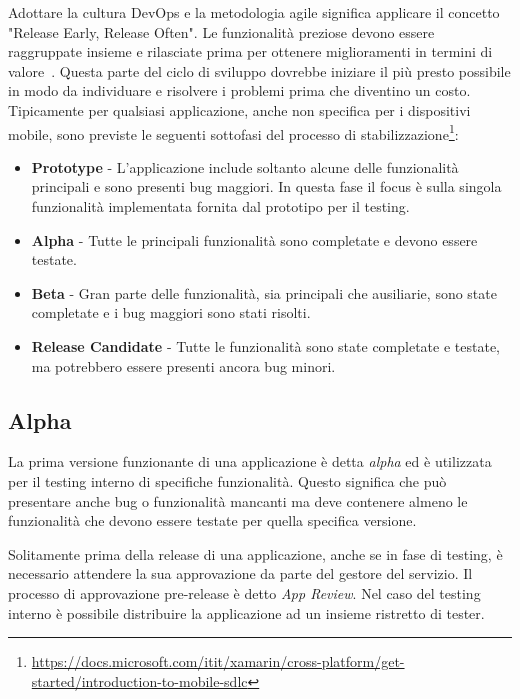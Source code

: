 Adottare la cultura DevOps e la metodologia agile significa applicare il concetto "Release Early, Release Often". Le funzionalità preziose devono essere raggruppate insieme e rilasciate prima per ottenere miglioramenti in termini di valore~\cite{shore2008art}. Questa parte del ciclo di sviluppo dovrebbe iniziare il più presto possibile in modo da individuare e risolvere i problemi prima che diventino un costo. Tipicamente per qualsiasi applicazione, anche non specifica per i dispositivi mobile, sono previste le seguenti sottofasi del processo di stabilizzazione\footnote{\href{https://docs.microsoft.com/itit/xamarin/cross-platform/get-started/introduction-to-mobile-sdlc}{https://docs.microsoft.com/itit/xamarin/cross-platform/get-started/introduction-to-mobile-sdlc}}:
\begin{itemize}
    \item \textbf{Prototype} - L'applicazione include soltanto alcune delle funzionalità principali e sono presenti bug maggiori. In questa fase il focus è sulla singola funzionalità implementata fornita dal prototipo per il testing.
    \item \textbf{Alpha} - Tutte le principali funzionalità sono completate e devono essere testate.
    \item \textbf{Beta} - Gran parte delle funzionalità, sia principali che ausiliarie, sono state completate e i bug maggiori sono stati risolti.
    \item \textbf{Release Candidate} - Tutte le funzionalità sono state completate e testate, ma potrebbero essere presenti ancora bug minori.
\end{itemize}

\subsection{Alpha}
La prima versione funzionante di una applicazione è detta \textit{alpha} ed è utilizzata per il testing interno di specifiche funzionalità. Questo significa che può presentare anche bug o funzionalità mancanti ma deve contenere almeno le funzionalità che devono essere testate per quella specifica versione.

Solitamente prima della release di una applicazione, anche se in fase di testing, è necessario attendere la sua approvazione da parte del gestore del servizio. Il processo di approvazione pre-release è detto \textit{App Review}. Nel caso del testing interno è possibile distribuire la applicazione ad un insieme ristretto di tester.

